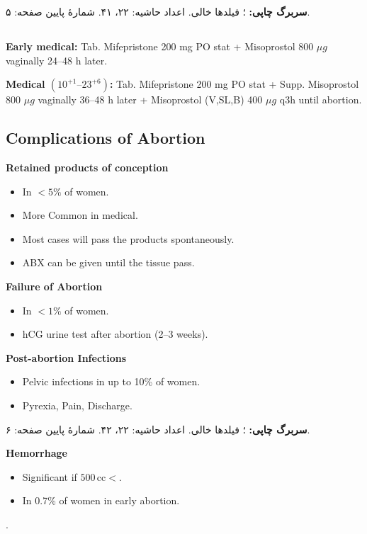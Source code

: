 \documentclass[12pt,a4paper]{article}
\begin{document}
\textbf{سربرگ چاپی:} ؛ فیلدها خالی. اعداد حاشیه: ۲۲، ۴۱. شمارهٔ پایین صفحه: ۵.

\subsection*{}
\begin{latin}
\textbf{Early medical:}
Tab. Mifepristone 200 mg PO stat + Misoprostol 800 \(\mu g\) vaginally 24--48 h later.

\textbf{Medical \((10^{+1}\text{--}23^{+6})\):}
Tab. Mifepristone 200 mg PO stat + Supp. Misoprostol 800 \(\mu g\) vaginally 36--48 h later + Misoprostol (V,SL,B) 400 \(\mu g\) q3h until abortion.

\subsection*{Complications of Abortion}
\textbf{Retained products of conception}
\begin{itemize}
\item In \(<5\%\) of women.
\item More Common in medical.
\item Most cases will pass the products spontaneously.
\item ABX can be given until the tissue pass.
\end{itemize}

\textbf{Failure of Abortion}
\begin{itemize}
\item In \(<1\%\) of women.
\item hCG urine test after abortion (2--3 weeks).
\end{itemize}

\textbf{Post-abortion Infections}
\begin{itemize}
\item Pelvic infections in up to 10\% of women.
\item Pyrexia, Pain, Discharge.
\end{itemize}
\end{latin}

\textbf{سربرگ چاپی:} ؛ فیلدها خالی. اعداد حاشیه: ۲۲، ۴۲. شمارهٔ پایین صفحه: ۶.

\begin{latin}
\textbf{Hemorrhage}
\begin{itemize}
\item Significant if \(500\,\mathrm{cc}<\).
\item In 0.7\% of women in early abortion.
\end{itemize}
\end{latin}
.
\end{document}
